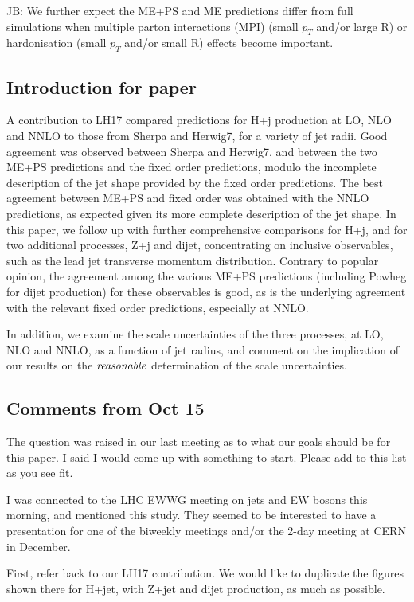 \documentclass[aps,prd,onecolumn,fleqn,superscriptaddress,groupedaddress,nofootinbib,preprintnumbers,nobalancelastpage]{revtex4}
\begin{document}
JB: We further expect the ME+PS and ME predictions differ from full simulations when multiple parton interactions (MPI) (small $p_T$ and/or large R) or hardonisation  (small $p_T$ and/or small R) effects become important. 

\subsection{Introduction for paper}

A contribution to LH17 compared predictions for H+j production at LO, NLO and NNLO to those from Sherpa and Herwig7, for a variety of jet radii. Good agreement was observed between Sherpa and Herwig7, and between the two ME+PS predictions and the fixed order predictions, modulo the incomplete description of the jet shape provided by the fixed order predictions. The best agreement between ME+PS and fixed order was obtained with the NNLO predictions, as expected given its more complete description of the jet shape. In this paper, we follow up with further comprehensive comparisons for H+j, and for two additional processes, Z+j and dijet, concentrating on inclusive observables, such as the lead jet transverse momentum distribution. Contrary to popular opinion, the agreement among the various ME+PS predictions (including Powheg for dijet production) for these observables is good, as is the underlying agreement with the relevant fixed order predictions, especially at NNLO. 

In addition, we examine the scale uncertainties of the three processes, at LO, NLO and NNLO, as a function of jet radius, and comment on the implication of our results on the $\it reasonable$ determination of the scale uncertainties. 

\subsection{Comments from Oct 15}

The question was raised in our last meeting as to what our goals should be for this paper. I said I would come up with something to start. Please add to this list as you see fit. 

I was connected to the LHC EWWG meeting on jets and EW bosons this morning, and mentioned this study. They seemed to be interested to have a presentation for one of the biweekly meetings and/or the 2-day meeting at CERN in December. 

First, refer back to our LH17 contribution. We would like to duplicate the figures shown there for H+jet, with Z+jet and dijet production, as much as possible. 
\end{document}
